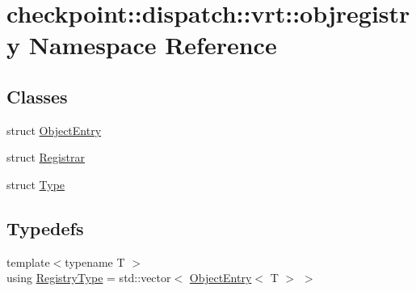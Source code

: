 \hypertarget{namespacecheckpoint_1_1dispatch_1_1vrt_1_1objregistry}{}\section{checkpoint\+:\+:dispatch\+:\+:vrt\+:\+:objregistry Namespace Reference}
\label{namespacecheckpoint_1_1dispatch_1_1vrt_1_1objregistry}
\subsection*{Classes}
\begin{DoxyCompactItemize}
\item 
struct \hyperlink{structcheckpoint_1_1dispatch_1_1vrt_1_1objregistry_1_1_object_entry}{Object\+Entry}
\item 
struct \hyperlink{structcheckpoint_1_1dispatch_1_1vrt_1_1objregistry_1_1_registrar}{Registrar}
\item 
struct \hyperlink{structcheckpoint_1_1dispatch_1_1vrt_1_1objregistry_1_1_type}{Type}
\end{DoxyCompactItemize}
\subsection*{Typedefs}
\begin{DoxyCompactItemize}
\item 
{\footnotesize template$<$typename T $>$ }\\using \hyperlink{namespacecheckpoint_1_1dispatch_1_1vrt_1_1objregistry_a052bc9d365db250a655ce65d920c5980}{Registry\+Type} = std\+::vector$<$ \hyperlink{structcheckpoint_1_1dispatch_1_1vrt_1_1objregistry_1_1_object_entry}{Object\+Entry}$<$ T $>$ $>$
\end{DoxyCompactItemize}
